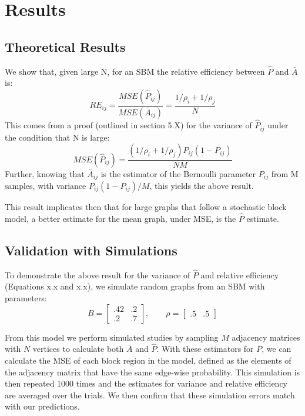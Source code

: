 \section{Results}
\subsection{Theoretical Results}
We show that, given large N, for an SBM the relative efficiency between $\hat{P}$ and $\bar{A}$ is:
\begin{equation}
RE_{ij} =\frac{MSE(\hat{P}_{ij})}{MSE(\bar{A}_{ij})} = \frac{1/\rho_i + 1/\rho_j}{N}
\end{equation}
This comes from a proof (outlined in section 5.X) for the variance of $\hat{P}_{ij}$ under the condition that N is large:
\begin{equation}
MSE(\hat{P}_{ij}) = \frac{(1/\rho_i + 1/\rho_j)P_{ij}(1-P_{ij})}{NM}
\end{equation}
Further, knowing that $\bar{A}_{ij}$ is the estimator of the Bernoulli parameter $P_{ij}$ from M samples, with variance $P_{ij}(1-P_{ij})/M$, this yields the above result.

This result implicates then that for large graphs that follow a stochastic block model, a better estimate for the mean graph, under MSE, is the $\hat{P}$ estimate.
\subsection{Validation with Simulations}
To demonstrate the above result for the variance of $\hat{P}$ and relative efficiency (Equations x.x and x.x), we simulate random graphs from an SBM with parameters:
\begin{equation*}
B = \begin{bmatrix}
.42 & .2 \\
.2 & .7 
\end{bmatrix}
,\qquad \rho = \begin{bmatrix}
.5 & .5
\end{bmatrix}
\end{equation*}

From this model we perform simulated studies by sampling $M$ adjacency matrices with $N$ vertices to calculate both $\bar{A}$ and $\hat{P}$.  With these estimators for $P$, we can calculate the MSE of each block region in the model, defined as the elements of the adjacency matrix that have the same edge-wise probability.  This simulation is then repeated 1000 times and the estimates for variance and relative efficiency are averaged over the trials.  We then confirm that these simulation errors match with our predictions.

